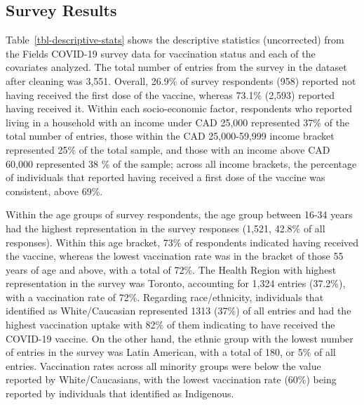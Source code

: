 \documentclass[
  letterpaper,
  DIV=11,
  numbers=noendperiod]{scrartcl}
\begin{document}
\hypertarget{survey-results}{%
\subsection{Survey Results}\label{survey-results}}

Table~\ref{tbl-descriptive-stats} shows the descriptive statistics
(uncorrected) from the Fields COVID-19 survey data for vaccination
status and each of the covariates analyzed. The total number of entries
from the survey in the dataset after cleaning was 3,551. Overall, 26.9\%
of survey respondents (958) reported not having received the first dose
of the vaccine, whereas 73.1\% (2,593) reported having received it.
Within each socio-economic factor, respondents who reported living in a
household with an income under CAD 25,000 represented 37\% of the total
number of entries, those within the CAD 25,000-59,999 income bracket
represented 25\% of the total sample, and those with an income above CAD
60,000 represented 38 \% of the sample; across all income brackets, the
percentage of individuals that reported having received a first dose of
the vaccine was consistent, above 69\%.

Within the age groups of survey respondents, the age group between 16-34
years had the highest representation in the survey responses (1,521,
42.8\% of all responses). Within this age bracket, 73\% of respondents
indicated having received the vaccine, whereas the lowest vaccination
rate was in the bracket of those 55 years of age and above, with a total
of 72\%. The Health Region with highest representation in the survey was
Toronto, accounting for 1,324 entries (37.2\%), with a vaccination rate
of 72\%. Regarding race/ethnicity, individuals that identified as
White/Caucasian represented 1313 (37\%) of all entries and had the
highest vaccination uptake with 82\% of them indicating to have received
the COVID-19 vaccine. On the other hand, the ethnic group with the
lowest number of entries in the survey was Latin American, with a total
of 180, or 5\% of all entries. Vaccination rates across all minority
groups were below the value reported by White/Caucasians, with the
lowest vaccination rate (60\%) being reported by individuals that
identified as Indigenous.
\end{document}
